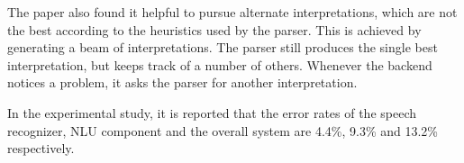 The paper also found it helpful to pursue alternate interpretations, which are not the best according to the heuristics used by the parser. This is achieved by generating a beam of interpretations. The parser still produces the single best interpretation, but keeps track of a number of others. Whenever the backend notices a problem, it asks the parser for another interpretation.

In the experimental study, it is reported that the error rates of the speech recognizer, NLU component and the overall system are 4.4\%, 9.3\% and 13.2\% respectively.
